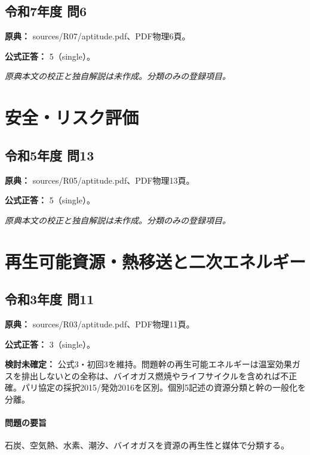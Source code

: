 \subsection{令和7年度 問6}
\label{q:r07-reg-apt-06}

\noindent\textbf{原典：} sources/R07/aptitude.pdf、PDF物理6頁。

\textbf{公式正答：} 5（single）。

\par\textit{原典本文の校正と独自解説は未作成。分類のみの登録項目。}

\section{安全・リスク評価}

\subsection{令和5年度 問13}
\label{q:r05-reg-apt-13}

\noindent\textbf{原典：} sources/R05/aptitude.pdf、PDF物理13頁。

\textbf{公式正答：} 5（single）。

\par\textit{原典本文の校正と独自解説は未作成。分類のみの登録項目。}

\section{再生可能資源・熱移送と二次エネルギー}

\subsection{令和3年度 問11}
\label{q:r03-reg-apt-11}

\noindent\textbf{原典：} sources/R03/aptitude.pdf、PDF物理11頁。

\textbf{公式正答：} 3（single）。

\par\textbf{検討未確定：} 公式3・初回3を維持。問題幹の再生可能エネルギーは温室効果ガスを排出しないとの全称は、バイオガス燃焼やライフサイクルを含めれば不正確。パリ協定の採択2015/発効2016を区別。個別5記述の資源分類と幹の一般化を分離。

\paragraph{問題の要旨} 石炭、空気熱、水素、潮汐、バイオガスを資源の再生性と媒体で分類する。

